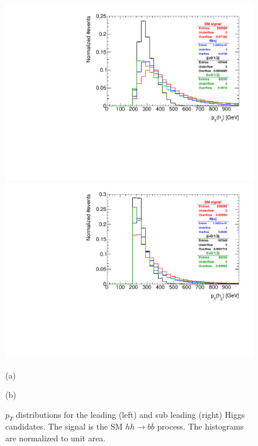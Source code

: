 \begin{figure}
	\centering
	\begin{minipage}{.5\textwidth}
		\centering
		\includegraphics[trim={.65cm 0 0 0},clip,width=\linewidth]{./Figures/hist_h1_pt.pdf}
	\end{minipage}%
	\begin{minipage}{.5\textwidth}
		\centering
		\includegraphics[trim={0 0 .65cm 0},clip,width=\linewidth]{./Figures/hist_h2_pt.pdf}
	\end{minipage}
	\begin{minipage}[t]{0.5\textwidth}
		\caption*{(a)}
	\end{minipage}%
	\hfill
	\begin{minipage}[t]{0.5\textwidth}
		\caption*{(b)}
	\end{minipage}
	\caption{$p_T$ distributions for the leading (left) and sub leading (right) Higgs candidates. The signal is the SM $hh\rightarrow b\overline{b}$ process. The histograms are normalized to unit area.}
	\label{fig:h1h2_pt}
\end{figure}

